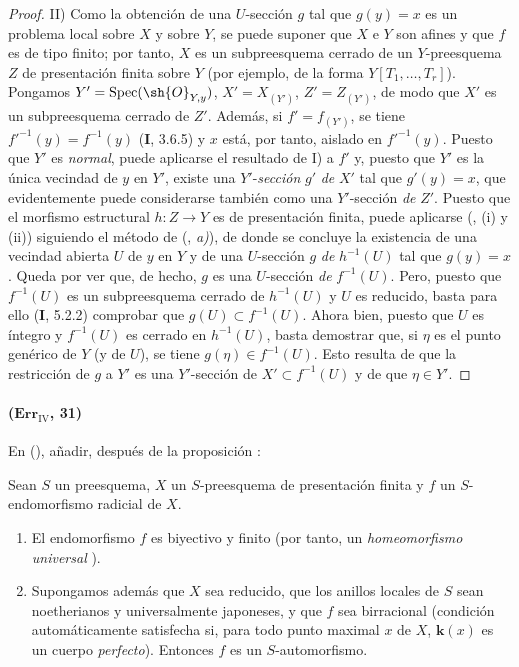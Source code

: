 \begin{proof}
\textup{II)} Como la obtención de una $U$-sección $g$ tal que $g(y)=x$ es
un problema local sobre $X$ y sobre $Y$, se puede suponer que $X$ e $Y$
son afines y que $f$ es de tipo finito; por tanto, $X$ es un
subpreesquema cerrado de un $Y$-preesquema $Z$ de presentación finita sobre
$Y$ (por ejemplo, de la forma $Y[T_1,\ldots,T_r]$). Pongamos
$Y'=\operatorname{Spec}(\sh{O}_{Y,y})$, $X'=X_{(Y')}$, $Z'=Z_{(Y')}$,
de modo que $X'$ es un subpreesquema cerrado de $Z'$. Además, si
$f'=f_{(Y')}$, se tiene $f'^{-1}(y)=f^{-1}(y)$ (\textbf I, 3.6.5) y $x$ está, por tanto,
aislado en $f'^{-1}(y)$. Puesto que $Y'$ es \emph{normal}, puede aplicarse el
resultado de I) a $f'$ y, puesto que $Y'$ es la única vecindad de $y$ en
$Y'$, existe una $Y'$-\emph{sección} $g'$ \emph{de} $X'$ tal que $g'(y)=x$, que
evidentemente puede considerarse también como una $Y'$-sección \emph{de} $Z'$.
Puesto que el morfismo estructural $h:Z\to Y$ es de presentación finita,
puede aplicarse ({}, (i) y
(ii)) siguiendo el método de
({}, \emph{a)}), de donde se concluye
la existencia de una vecindad abierta $U$ de $y$ en $Y$ y de una
$U$-sección $g$ \emph{de} $h^{-1}(U)$ tal que $g(y)=x$. Queda por ver
que, de hecho, $g$ es una $U$-sección \emph{de} $f^{-1}(U)$. Pero, puesto que
$f^{-1}(U)$ es un subpreesquema cerrado de $h^{-1}(U)$ y $U$ es
reducido, basta para ello (\textbf I, 5.2.2) comprobar que
$g(U)\subset f^{-1}(U)$. Ahora bien, puesto que $U$ es íntegro y $f^{-1}(U)$
es cerrado en $h^{-1}(U)$, basta demostrar que, si $\eta$ es el punto
genérico de $Y$ (y de $U$), se tiene $g(\eta)\in f^{-1}(U)$. Esto
resulta de que la restricción de $g$ a $Y'$ es una $Y'$-sección de
$X'\subset f^{-1}(U)$ y de que $\eta\in Y'$.
\end{proof}

\paragraph{($\mathbf{Err}_{\mathrm{IV}}$, 31)}
En ({}), añadir, después de la
proposición {}:

\begin{corollary}[10.4.12]
\label{IV.10.4.12}
Sean $S$ un preesquema, $X$ un $S$-preesquema de presentación finita y
$f$ un $S$-endomorfismo radicial de $X$.
\begin{enumerate}[label=\textup{(\roman*)}]
\item El endomorfismo $f$ es biyectivo y \textup{finito (por tanto, un \emph{homeomorfismo
universal} {})}.
\item Supongamos además que $X$ sea reducido, que los anillos locales de
$S$ sean noetherianos y universalmente japoneses, y que $f$ sea
birracional \textup{(condición automáticamente satisfecha si, para todo punto
maximal $x$ de $X$, $\boldsymbol{k}(x)$ es un cuerpo \emph{perfecto})}. Entonces $f$ es un
$S$-automorfismo.
\end{enumerate}
\end{corollary}


